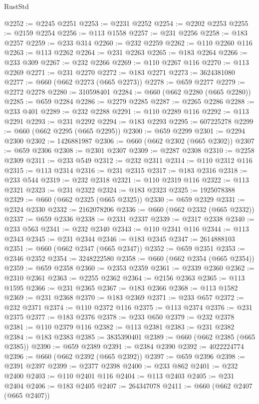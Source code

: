 \begin{lexlean}{RustStd}
\begin{coremodule}
{\begin{coremodule}
{{{{{{{{{{{{{{{{{{{{{{{{{{{{{{{{{{{{{{{{{{{{{{{@2252 := @2245 @2251
@2253 := @2231 @2252
@2254 := @2202 @2253
@2255 := @2159 @2254
@2256 := @113 @1558
@2257 := @231 @2256
@2258 := @183 @2257
@2259 := @233 @314
@2260 := @232 @2259
@2262 := @110 @2260 @116
@2263 := @113 @2262
@2264 := @231 @2263
@2265 := @183 @2264
@2266 := @233 @309
@2267 := @232 @2266
@2269 := @110 @2267 @116
@2270 := @113 @2269
@2271 := @231 @2270
@2272 := @183 @2271
@2273 := 3624381080
@2277 := @660 (@662 @2273 (@665 @2273))
@2278 := @659 @2277
@2279 := @2272 @2278
@2280 := 310598401
@2284 := @660 (@662 @2280 (@665 @2280))
@2285 := @659 @2284
@2286 := @2279 @2285
@2287 := @2265 @2286
@2288 := @233 @401
@2289 := @232 @2288
@2291 := @110 @2289 @116
@2292 := @113 @2291
@2293 := @231 @2292
@2294 := @183 @2293
@2295 := 607225278
@2299 := @660 (@662 @2295 (@665 @2295))
@2300 := @659 @2299
@2301 := @2294 @2300
@2302 := 1426881987
@2306 := @660 (@662 @2302 (@665 @2302))
@2307 := @659 @2306
@2308 := @2301 @2307
@2309 := @2287 @2308
@2310 := @2258 @2309
@2311 := @233 @549
@2312 := @232 @2311
@2314 := @110 @2312 @116
@2315 := @113 @2314
@2316 := @231 @2315
@2317 := @183 @2316
@2318 := @233 @544
@2319 := @232 @2318
@2321 := @110 @2319 @116
@2322 := @113 @2321
@2323 := @231 @2322
@2324 := @183 @2323
@2325 := 1925078388
@2329 := @660 (@662 @2325 (@665 @2325))
@2330 := @659 @2329
@2331 := @2324 @2330
@2332 := 2162078206
@2336 := @660 (@662 @2332 (@665 @2332))
@2337 := @659 @2336
@2338 := @2331 @2337
@2339 := @2317 @2338
@2340 := @233 @563
@2341 := @232 @2340
@2343 := @110 @2341 @116
@2344 := @113 @2343
@2345 := @231 @2344
@2346 := @183 @2345
@2347 := 2614888103
@2351 := @660 (@662 @2347 (@665 @2347))
@2352 := @659 @2351
@2353 := @2346 @2352
@2354 := 3248222580
@2358 := @660 (@662 @2354 (@665 @2354))
@2359 := @659 @2358
@2360 := @2353 @2359
@2361 := @2339 @2360
@2362 := @2310 @2361
@2363 := @2255 @2362
@2364 := @2156 @2363
@2365 := @113 @1595
@2366 := @231 @2365
@2367 := @183 @2366
@2368 := @113 @1582
@2369 := @231 @2368
@2370 := @183 @2369
@2371 := @233 @657
@2372 := @232 @2371
@2374 := @110 @2372 @116
@2375 := @113 @2374
@2376 := @231 @2375
@2377 := @183 @2376
@2378 := @233 @650
@2379 := @232 @2378
@2381 := @110 @2379 @116
@2382 := @113 @2381
@2383 := @231 @2382
@2384 := @183 @2383
@2385 := 3835390401
@2389 := @660 (@662 @2385 (@665 @2385))
@2390 := @659 @2389
@2391 := @2384 @2390
@2392 := 4022224774
@2396 := @660 (@662 @2392 (@665 @2392))
@2397 := @659 @2396
@2398 := @2391 @2397
@2399 := @2377 @2398
@2400 := @233 @862
@2401 := @232 @2400
@2403 := @110 @2401 @116
@2404 := @113 @2403
@2405 := @231 @2404
@2406 := @183 @2405
@2407 := 264347078
@2411 := @660 (@662 @2407 (@665 @2407))
}}}}}}}}}}}}}}}}}}}}}}}}}}}}}}}}}}}}}}}}}}}}}}}
\end{coremodule}}
\end{coremodule}
\end{lexlean}
